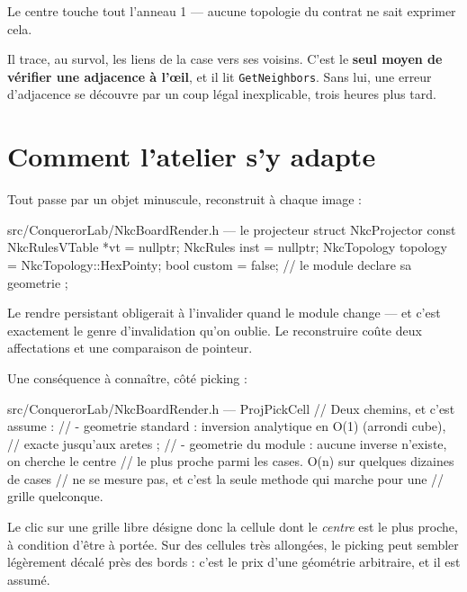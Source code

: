 Le centre touche tout l'anneau 1 — aucune topologie du contrat ne sait exprimer
cela.

\begin{nkretenir}
Il trace, au survol, les liens de la case vers ses voisins. C'est le \textbf{seul
moyen de vérifier une adjacence à l'œil}, et il lit \texttt{GetNeighbors}. Sans
lui, une erreur d'adjacence se découvre par un coup légal inexplicable, trois
heures plus tard.
\end{nkretenir}

\section{Comment l'atelier s'y adapte}

Tout passe par un objet minuscule, reconstruit à chaque image :

\begin{nkcode}{src/ConquerorLab/NkcBoardRender.h — le projecteur}
struct NkcProjector {
        const NkcRulesVTable *vt       = nullptr;
        NkcRules              inst     = nullptr;
        NkcTopology           topology = NkcTopology::HexPointy;
        bool                  custom   = false;  // le module declare sa geometrie
};
\end{nkcode}

\begin{nkretenir}
Le rendre persistant obligerait à l'invalider quand le module change — et c'est
exactement le genre d'invalidation qu'on oublie. Le reconstruire coûte deux
affectations et une comparaison de pointeur.
\end{nkretenir}

Une conséquence à connaître, côté picking :

\begin{nkcode}{src/ConquerorLab/NkcBoardRender.h — ProjPickCell}
// Deux chemins, et c'est assume :
//   - geometrie standard : inversion analytique en O(1) (arrondi cube),
//     exacte jusqu'aux aretes ;
//   - geometrie du module : aucune inverse n'existe, on cherche le centre
//     le plus proche parmi les cases. O(n) sur quelques dizaines de cases
//     ne se mesure pas, et c'est la seule methode qui marche pour une
//     grille quelconque.
\end{nkcode}

Le clic sur une grille libre désigne donc la cellule dont le \emph{centre} est le
plus proche, à condition d'être à portée. Sur des cellules très allongées, le
picking peut sembler légèrement décalé près des bords : c'est le prix d'une
géométrie arbitraire, et il est assumé.

